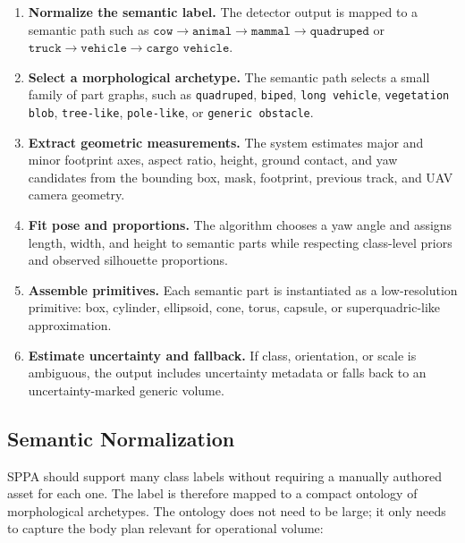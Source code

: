 ﻿\documentclass[11pt,a4paper]{article}
\begin{document}
\begin{enumerate}
    \item \textbf{Normalize the semantic label.} The detector output is mapped
    to a semantic path such as
    \(\texttt{cow}\rightarrow\texttt{animal}\rightarrow\texttt{mammal}
    \rightarrow\texttt{quadruped}\) or
    \(\texttt{truck}\rightarrow\texttt{vehicle}\rightarrow
    \texttt{cargo vehicle}\).
    \item \textbf{Select a morphological archetype.} The semantic path selects
    a small family of part graphs, such as \texttt{quadruped},
    \texttt{biped}, \texttt{long vehicle}, \texttt{vegetation blob},
    \texttt{tree-like}, \texttt{pole-like}, or \texttt{generic obstacle}.
    \item \textbf{Extract geometric measurements.} The system estimates major
    and minor footprint axes, aspect ratio, height, ground contact, and yaw
    candidates from the bounding box, mask, footprint, previous track, and UAV
    camera geometry.
    \item \textbf{Fit pose and proportions.} The algorithm chooses a yaw angle
    and assigns length, width, and height to semantic parts while respecting
    class-level priors and observed silhouette proportions.
    \item \textbf{Assemble primitives.} Each semantic part is instantiated as a
    low-resolution primitive: box, cylinder, ellipsoid, cone, torus, capsule, or
    superquadric-like approximation.
    \item \textbf{Estimate uncertainty and fallback.} If class, orientation, or
    scale is ambiguous, the output includes uncertainty metadata or falls back
    to an uncertainty-marked generic volume.
\end{enumerate}

\subsection{Semantic Normalization}

SPPA should support many class labels without requiring a manually authored
asset for each one. The label is therefore mapped to a compact ontology of
morphological archetypes. The ontology does not need to be large; it only needs
to capture the body plan relevant for operational volume:
\end{document}
